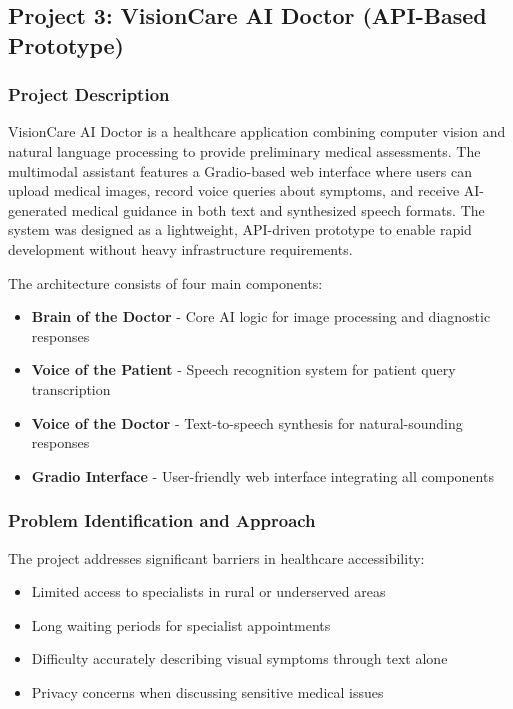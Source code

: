 \subsection{Project 3: VisionCare AI Doctor (API-Based Prototype)}

\subsubsection{Project Description}
VisionCare AI Doctor is a healthcare application combining computer vision and natural language processing to provide preliminary medical assessments. The multimodal assistant features a Gradio-based web interface where users can upload medical images, record voice queries about symptoms, and receive AI-generated medical guidance in both text and synthesized speech formats. The system was designed as a lightweight, API-driven prototype to enable rapid development without heavy infrastructure requirements.

The architecture consists of four main components:
\begin{itemize}
    \item \textbf{Brain of the Doctor} - Core AI logic for image processing and diagnostic responses
    \item \textbf{Voice of the Patient} - Speech recognition system for patient query transcription
    \item \textbf{Voice of the Doctor} - Text-to-speech synthesis for natural-sounding responses
    \item \textbf{Gradio Interface} - User-friendly web interface integrating all components
\end{itemize}

\subsubsection{Problem Identification and Approach}
The project addresses significant barriers in healthcare accessibility:
\begin{itemize}
    \item Limited access to specialists in rural or underserved areas
    \item Long waiting periods for specialist appointments
    \item Difficulty accurately describing visual symptoms through text alone
    \item Privacy concerns when discussing sensitive medical issues
\end{itemize}

